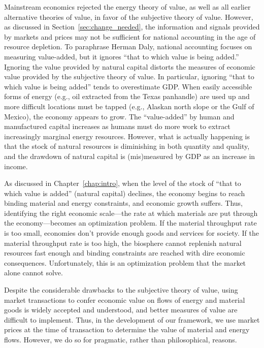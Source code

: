 Mainstream economics rejected the energy theory of value,
as well as all earlier alternative theories of value,
in favor of the subjective theory of value. 
However, as discussed in Section~\ref{sec:change_needed}, 
the information and signals provided by markets and prices 
may not be sufficient for national accounting in
the age of resource depletion. 
To paraphrase Herman Daly, 
national accounting focuses on measuring value-added, 
but it ignores ``that to which value is being added.'' \cite[p. 453]{Daly1995}
Ignoring the value provided by natural capital
distorts the measures of economic value provided by the subjective theory of value.
In particular, 
ignoring ``that to which value is being added'' 
tends to overestimate GDP. 
When easily accessible forms of energy 
(e.g., oil extracted from the Texas panhandle) 
are used up and more difficult locations must be tapped 
(e.g., Alaskan north slope or the Gulf of Mexico), 
the economy appears to grow.
The ``value-added'' by human and manufactured capital increases 
as humans must do more work to extract increasingly marginal 
energy resources. 
However, what is actually happening is that the stock 
of natural resources is diminishing in both quantity and quality, 
and the drawdown of natural capital is (mis)measured by GDP as 
an increase in income.\cite[pp.~66~and~75]{Daly1997}

As discussed in Chapter~\ref{chap:intro}, 
when the level of the stock of ``that to which value is added'' 
(natural capital) declines, 
the economy begins to reach binding material and energy constraints, 
and economic growth suffers. 
Thus, identifying the right economic 
scale---the rate at which materials are put through the 
economy---becomes an optimization problem. 
If the material throughput rate is too small, 
economies don't provide enough goods and services for society.
If the material throughput rate is too high, 
the biosphere cannot replenish natural resources fast enough and
binding constraints are reached with dire economic consequences.
Unfortunately, this is an optimization 
problem that the market alone cannot solve. 

Despite the considerable drawbacks to the subjective theory of value, 
using market transactions to confer economic value
on flows of energy and material goods is widely accepted and understood, and 
better measures of value are difficult to implement. 
Thus, in the development of our framework, 
we use market prices at the time of transaction to determine the value of 
material and energy flows.
However, we do so for pragmatic, rather than philosophical, reasons.

